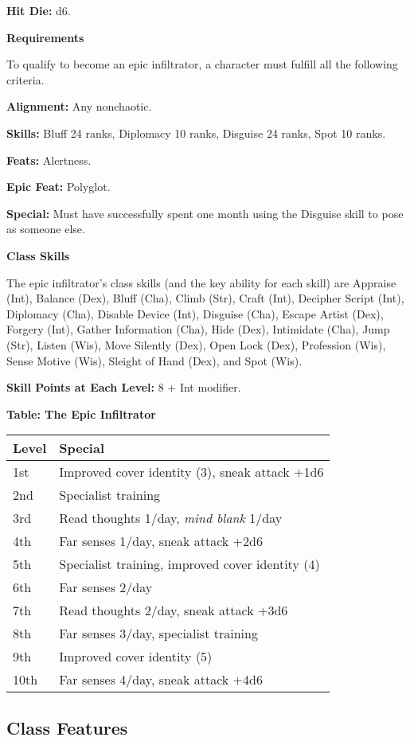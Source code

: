 \documentclass{article}
\begin{document}
\textbf{Hit Die:} d6. 

\textbf{Requirements}

To qualify to become an epic infiltrator, a character must fulfill all the following 
criteria. 

\textbf{Alignment:} Any nonchaotic.

\textbf{Skills:} Bluff 24 ranks, Diplomacy 10 ranks, Disguise 24 ranks, Spot 10 
ranks. 

\textbf{Feats:} Alertness. 

\textbf{Epic Feat:} Polyglot. 

\textbf{Special:} Must have successfully spent one month using the Disguise skill 
to pose as someone else. 

\textbf{Class Skills}

The epic infiltrator's class skills (and the key ability for each skill) are Appraise 
(Int), Balance (Dex), Bluff (Cha), Climb (Str), Craft (Int), Decipher Script (Int), 
Diplomacy (Cha), Disable Device (Int), Disguise (Cha), Escape Artist (Dex), Forgery 
(Int), Gather Information (Cha), Hide (Dex), Intimidate (Cha), Jump (Str), Listen 
(Wis), Move Silently (Dex), Open Lock (Dex), Profession (Wis), Sense Motive (Wis), 
Sleight of Hand (Dex), and Spot (Wis). 

\textbf{Skill Points at Each Level:} 8 + Int modifier. 

\vspace{12pt}
\textbf{Table: The Epic Infiltrator }

\begin{tabular}{|>{\raggedright}p{27pt}|>{\raggedright}p{194pt}|}
\hline
L\textbf{evel} & S\textbf{pecial }\tabularnewline
\hline
1st & Improved cover identity (3), sneak attack +1d6 \tabularnewline
\hline
2nd & Specialist training \tabularnewline
\hline
3rd & Read thoughts 1/day, \textit{mind blank }1/day \tabularnewline
\hline
4th & Far senses 1/day, sneak attack +2d6 \tabularnewline
\hline
5th & Specialist training, improved cover identity (4) \tabularnewline
\hline
6th & Far senses 2/day \tabularnewline
\hline
7th & Read thoughts 2/day, sneak attack +3d6\tabularnewline
\hline
8th & Far senses 3/day, specialist training \tabularnewline
\hline
9th & Improved cover identity (5) \tabularnewline
\hline
10th & Far senses 4/day, sneak attack +4d6 \tabularnewline
\hline
\end{tabular}

\vspace{12pt}
\subsection*{\textbf{Class Features}}
\end{document}
